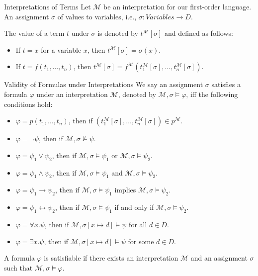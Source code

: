 \documentclass{beamer}
\begin{document}
  \begin{frame}{Interpretations of Terms}
    Let $\mathcal{M}$ be an interpretation for our first-order language. 
    An assignment $\sigma$ of values to variables, i.e., $\sigma: Variables\rightarrow D$. 
    
    The value of a term $t$ under $\sigma$ is denoted by $t^{\mathcal{M}}[\sigma]$ and defined as follows:
    \begin{itemize}
    \item If $t=x$ for a variable $x$, then $t^{\mathcal{M}}[\sigma]=\sigma(x)$.
    \item If $t=f(t_1, \ldots, t_n)$, then $t^{\mathcal{M}}[\sigma]=f^{\mathcal{M}}(t_1^{\mathcal{M}}[\sigma], \ldots, t_n^{\mathcal{M}}[\sigma])$.
    \end{itemize}
  \end{frame}
  \begin{frame}{Validity of Formulas under Interpretations}
    We say an assignment $\sigma$ satisfies a formula $\varphi$ under an interpretation $\mathcal{M}$, denoted by $\mathcal{M}, \sigma\models\varphi$, iff the following conditions hold:
    \begin{itemize}
    \item $\varphi=p(t_1, \ldots, t_n)$, then if $(t_1^{\mathcal{M}}[\sigma], \ldots, t_n^{\mathcal{M}}[\sigma])\in p^{\mathcal{M}}$.
    \item $\varphi=\neg\psi$, then if $\mathcal{M}, \sigma\not\models\psi$.
    \item $\varphi=\psi_1\vee\psi_2$, then if $\mathcal{M}, \sigma\models\psi_1$ or $\mathcal{M}, \sigma\models\psi_2$.
    \item $\varphi=\psi_1\wedge\psi_2$, then if $\mathcal{M}, \sigma\models\psi_1$ and $\mathcal{M}, \sigma\models\psi_2$.
    \item $\varphi=\psi_1\rightarrow\psi_2$, then if $\mathcal{M}, \sigma\models\psi_1$ implies $\mathcal{M}, \sigma\models\psi_2$.
    \item $\varphi=\psi_1\leftrightarrow\psi_2$, then if $\mathcal{M}, \sigma\models\psi_1$ if and only if $\mathcal{M}, \sigma\models\psi_2$.
    \item $\varphi=\forall x.\psi$, then if $\mathcal{M}, \sigma[x\mapsto d]\models\psi$ for all $d\in D$.
    \item $\varphi=\exists x.\psi$, then if $\mathcal{M}, \sigma[x\mapsto d]\models\psi$ for some $d\in D$.
    \end{itemize}
    A formula $\varphi$ is satisfiable if there exists an interpretation $\mathcal{M}$ and an assignment $\sigma$ such that $\mathcal{M}, \sigma\models\varphi$.
  \end{frame}
\end{document}
